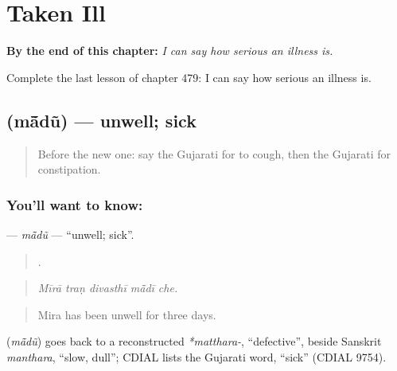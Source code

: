 
\chapter{Taken Ill}
\label{ch:gu-taken-ill}

\begin{chapteropening}
\textbf{By the end of this chapter:} \emph{I can say how serious an illness is.}

Complete the last lesson of chapter 479: I can say how serious an illness is.
\end{chapteropening}

\section[\texorpdfstring{\gu{માંદું} (mā̃dũ)}{માંદું (mā̃dũ)}]{ (mā̃dũ) — unwell; sick}

\label{lesson:GU-C479-madu}



\begin{quote}
Before the new one: say the Gujarati for to cough, then the Gujarati for constipation.
\end{quote}

\subsection*{You'll want to know: }
\textbf{} — \emph{mā̃dũ} — \textquotedblleft{}unwell; sick\textquotedblright{}.

\begin{quote}
    .
\end{quote}

\begin{quote}
\emph{Mīrā traṇ divasthī mā̃dī che.}
\end{quote}

\begin{quote}
Mira has been unwell for three days.
\end{quote}

\begin{cousinweb}
\textbf{} (\emph{mā̃dũ}) goes back to a reconstructed \emph{*matthara-}, \textquotedblleft{}defective\textquotedblright{}, beside Sanskrit \emph{manthara}, \textquotedblleft{}slow, dull\textquotedblright{}; CDIAL lists the Gujarati word, \textquotedblleft{}sick\textquotedblright{} (CDIAL 9754).
\end{cousinweb}

